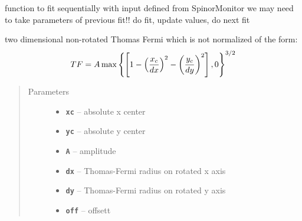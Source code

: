 \documentclass[letterpaper,10pt,english]{sphinxmanual}
\begin{document}
\begin{fulllineitems}
\begin{fulllineitems}
\begin{quote}
\begin{description}
\end{description}\end{quote}

\end{fulllineitems}


\begin{fulllineitems}
\label{fit_object:Fitobject.fit_object.multiple_fits}
function to fit sequentially with input defined from SpinorMonitor
we may need to take parameters of previous fit!!
do fit, update values, do next fit

\end{fulllineitems}


\begin{fulllineitems}
\label{fit_object:Fitobject.fit_object.partial_TF_2D}
two dimensional non-rotated Thomas Fermi which is not normalized of the form:
\begin{gather}
\begin{split}TF = A \max\left\{\left[1-\left(\frac{x_c}{dx}\right)^2-\left(\frac{y_c}{dy}\right)^2\right],0\right\}^{3/2}\end{split}\notag
\end{gather}\begin{quote}\begin{description}
\item[{Parameters}] \leavevmode\begin{itemize}
\item {} 
\textbf{\texttt{xc}} -- absolute x center

\item {} 
\textbf{\texttt{yc}} -- absolute y center

\item {} 
\textbf{\texttt{A}} -- amplitude

\item {} 
\textbf{\texttt{dx}} -- Thomas-Fermi radius on rotated x axis

\item {} 
\textbf{\texttt{dy}} -- Thomas-Fermi radius on rotated y axis

\item {} 
\textbf{\texttt{off}} -- offsett


\end{itemize}
\end{description}
\end{quote}
\end{fulllineitems}
\end{fulllineitems}
\end{document}

